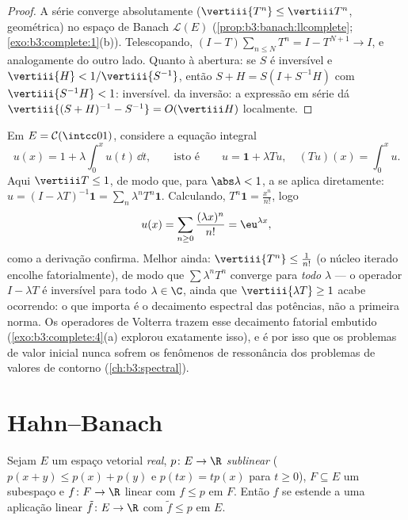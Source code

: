 \begin{proof}
A série converge absolutamente ($\vertiii{T^n} \leq \vertiii
T^n$, geométrica) no espaço de Banach
$\mathcal L(E)$ (\cref{prop:b3:banach:llcomplete}; \cref{exo:b3:complete:1}(b)). Telescopando, $(I - T)\sum_{n \leq
N}T^n = I - T^{N+1} \to I$, e
analogamente do outro lado. Quanto à abertura: se $S$ é inversível e
$\vertiii{H} <
1/\vertiii{S^{-1}}$, então $S + H = S(I + S^{-1}H)$ com $\vertiii{S^{-1}H} < 1$: inversível.  da inversão: a
expressão em série dá $\vertiii{(S+H)^{-1} - S^{-1}} =
O(\vertiii H)$ localmente.
\end{proof}

\begin{example}
\label{ex:b3:banach:volterraexample}
Em $E = \mathcal C(\intcc01)$, considere a equação integral
\[
u(x) = 1 + \lambda\int_0^xu(t)\,\dd t,
\qquad\text{isto é}\qquad u = \mathbf 1 + \lambda Tu,
\quad (Tu)(x) = \int_0^xu .
\]
Aqui $\vertiii T \leq 1$, de modo que, para $\abs\lambda < 1$, a  se aplica
diretamente: $u = (I - \lambda T)^{-1}\mathbf 1 =
\sum_n\lambda^nT^n\mathbf 1$. Calculando, $T^n\mathbf 1 =
\frac{x^n}{n!}$, logo
\[
u(x) = \sum_{n\geq0}\frac{(\lambda x)^n}{n!} =
\eu^{\lambda x} ,
\]
como a derivação confirma. Melhor ainda: $\vertiii{T^n} \leq
\frac1{n!}$ (o núcleo iterado encolhe
fatorialmente), de modo que $\sum\lambda^nT^n$ converge para \emph{todo} $\lambda$ --- o
operador $I - \lambda T$ é inversível para todo $\lambda
\in \C$, ainda que $\vertiii{\lambda T} \geq 1$ acabe
ocorrendo: o que importa é o decaimento espectral das potências, não a
primeira norma. Os operadores de Volterra trazem esse decaimento
fatorial embutido (\cref{exo:b3:complete:4}(a) explorou exatamente isso), e é por
isso que os problemas de valor inicial nunca sofrem os fenômenos de
ressonância dos problemas de valores de contorno (\cref{ch:b3:spectral}).
\end{example}

\section{Hahn--Banach}

\begin{theorem}
\label{thm:b3:banach:hahnbanach}
Sejam $E$ um espaço vetorial \emph{real}, $p \colon E \to \R$ \emph{sublinear}
($p(x + y) \leq p(x) + p(y)$ e $p(tx) =
tp(x)$ para $t \geq 0$), $F \subseteq E$ um subespaço e $f
\colon F \to \R$ linear com $f \leq p$ em
$F$. Então $f$ se estende a uma aplicação linear $\tilde f \colon E \to \R$ com $\tilde f \leq p$ em
$E$.
\end{theorem}

